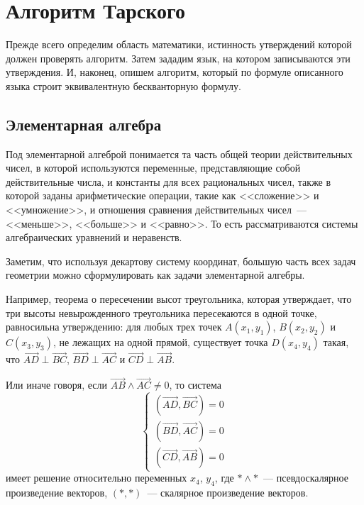 \section{Алгоритм Тарского}

Прежде всего определим область математики, истинность утверждений которой должен проверять алгоритм.
Затем зададим язык, на котором записываются эти утверждения.
И, наконец, опишем алгоритм, который по формуле описанного языка строит эквивалентную бескванторную формулу.

\subsection{Элементарная алгебра}

Под элементарной алгеброй понимается та часть общей теории действительных чисел, в которой используются переменные, представляющие собой действительные числа, и константы для всех рациональных чисел, также в которой заданы арифметические операции, такие как <<сложение>> и <<умножение>>, и отношения сравнения действительных чисел~--- <<меньше>>, <<больше>> и <<равно>>.
То есть рассматриваются системы алгебраических уравнений и неравенств.

Заметим, что используя декартову систему координат, большую часть всех задач геометрии можно сформулировать как задачи элементарной алгебры. 

Например, теорема о пересечении высот треугольника, которая утверждает, что три высоты невырожденного треугольника пересекаются в одной точке, равносильна утверждению: для любых трех точек $A(x_1, y_1)$, $B(x_2, y_2)$ и $C(x_3, y_3)$, не лежащих на одной прямой, существует точка $D(x_4, y_4)$ такая, что $\overrightarrow{AD} \perp \overrightarrow{BC}$, $\overrightarrow{BD} \perp \overrightarrow{AC}$ и $\overrightarrow{CD} \perp \overrightarrow{AB}$. 

Или иначе говоря, если $\overrightarrow{AB} \land \overrightarrow{AC} \neq 0$, то система
\begin{equation*}
    \begin{cases}
        \left(\overrightarrow{AD}, \overrightarrow{BC}\right) = 0 \\
        \left(\overrightarrow{BD}, \overrightarrow{AC}\right) = 0 \\
        \left(\overrightarrow{CD}, \overrightarrow{AB}\right) = 0
    \end{cases}
\end{equation*}
имеет решение относительно переменных $x_4$, $y_4$, где $* \land *$~--- псевдоскалярное произведение векторов, $(*, *)$~--- скалярное произведение векторов.

